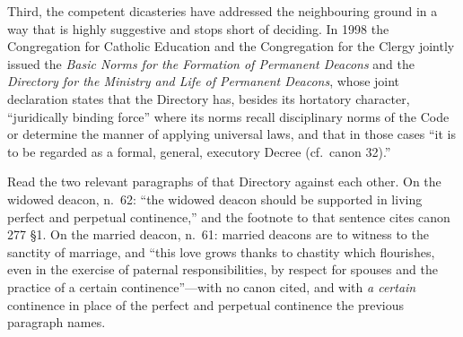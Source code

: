 Third, the competent dicasteries have addressed the neighbouring ground in a way that is highly suggestive and stops short of deciding. In 1998 the Congregation for Catholic Education and the Congregation for the Clergy jointly issued the \emph{Basic Norms for the Formation of Permanent Deacons} and the \emph{Directory for the Ministry and Life of Permanent Deacons}, whose joint declaration states that the Directory has, besides its hortatory character, ``juridically binding force'' where its norms recall disciplinary norms of the Code or determine the manner of applying universal laws, and that in those cases ``it is to be regarded as a formal, general, executory Decree (cf.\ canon 32).''

Read the two relevant paragraphs of that Directory against each other. On the widowed deacon, n.~62: ``the widowed deacon should be supported in living perfect and perpetual continence,'' and the footnote to that sentence cites canon 277 §1. On the married deacon, n.~61: married deacons are to witness to the sanctity of marriage, and ``this love grows thanks to chastity which flourishes, even in the exercise of paternal responsibilities, by respect for spouses and the practice of a certain continence''---with no canon cited, and with \emph{a certain} continence in place of the perfect and perpetual continence the previous paragraph names.

